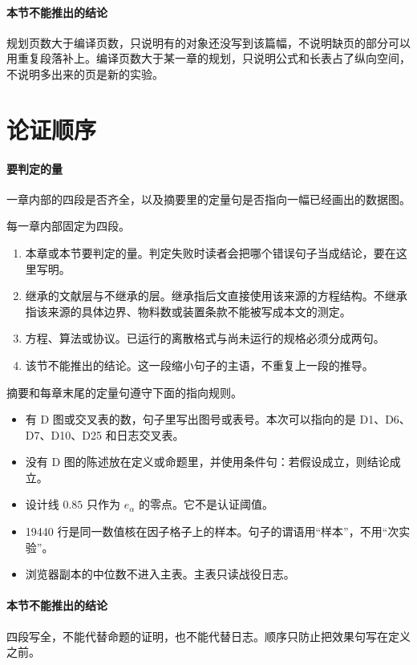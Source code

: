 \paragraph{本节不能推出的结论}
规划页数大于编译页数，只说明有的对象还没写到该篇幅，不说明缺页的部分可以用重复段落补上。编译页数大于某一章的规划，只说明公式和长表占了纵向空间，不说明多出来的页是新的实验。

\section{论证顺序}

\paragraph{要判定的量}
一章内部的四段是否齐全，以及摘要里的定量句是否指向一幅已经画出的数据图。

每一章内部固定为四段。

\begin{enumerate}
\item 本章或本节要判定的量。判定失败时读者会把哪个错误句子当成结论，要在这里写明。
\item 继承的文献层与不继承的层。继承指后文直接使用该来源的方程结构。不继承指该来源的具体边界、物料数或装置条款不能被写成本文的测定。
\item 方程、算法或协议。已运行的离散格式与尚未运行的规格必须分成两句。
\item 该节不能推出的结论。这一段缩小句子的主语，不重复上一段的推导。
\end{enumerate}

摘要和每章末尾的定量句遵守下面的指向规则。

\begin{itemize}
\item 有 D 图或交叉表的数，句子里写出图号或表号。本次可以指向的是 D1、D6、D7、D10、D25 和日志交叉表。
\item 没有 D 图的陈述放在定义或命题里，并使用条件句：若假设成立，则结论成立。
\item 设计线 \(0.85\) 只作为 \(e_{\alpha}\) 的零点。它不是认证阈值。
\item 19440 行是同一数值核在因子格子上的样本。句子的谓语用“样本”，不用“次实验”。
\item 浏览器副本的中位数不进入主表。主表只读战役日志。
\end{itemize}

\paragraph{本节不能推出的结论}
四段写全，不能代替命题的证明，也不能代替日志。顺序只防止把效果句写在定义之前。

